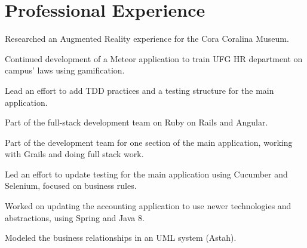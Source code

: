 \documentclass[]{deedy-resume-openfont}
\begin{document}
\begin{minipage}[t]{0.66\textwidth}


\section{Professional Experience}
\vspace{\topsep} %
\begin{tightemize}
\item Researched an Augmented Reality experience for the Cora Coralina Museum.
\item Continued development of a Meteor application to train UFG HR department on campus' laws using gamification.
\end{tightemize}

\vspace{0pt}
\begin{tightemize}
\item Lead an effort to add TDD practices and a testing structure for the main application.
\item Part of the full-stack development team on Ruby on Rails and Angular.
\end{tightemize}

\vspace{0pt}
\begin{tightemize}
\item Part of the development team for one section of the main application, working with Grails and doing full stack work.
\item Led an effort to update testing for the main application using Cucumber and Selenium, focused on business rules.
\end{tightemize}

\vspace{0pt}
\begin{tightemize}
\item Worked on updating the accounting application to use newer technologies and abstractions, using Spring and Java 8.
\item Modeled the business relationships in an UML system (Astah).
\end{tightemize}


\end{minipage}
\end{document}
